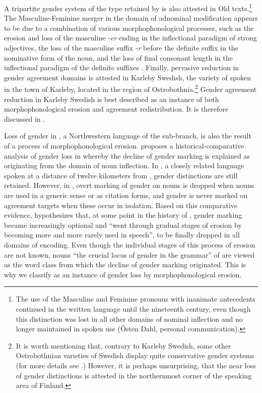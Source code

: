 \documentclass[output=collectionpaper]{langsci/langscibook}
\begin{document}
A tripartite gender system of the type retained by  is also attested in Old  texts.\footnote{The use of the Masculine and Feminine pronouns with inanimate antecedents continued in the written language until the nineteenth century, even though this distinction was lost in all other domains of nominal inflection and no longer maintained in spoken use (\"{O}sten Dahl, personal communication).} The Masculine-Feminine merger in the domain of adnominal modification appears to be due to a combination of various morphophonological processes, such as the erosion and loss of the masculine \textit{-er} ending in the inflectional paradigm of strong adjectives, the loss of the masculine suffix \textit{-r} before the definite suffix in the nominative form of the noun, and the loss of final consonant length in the inflectional paradigm of the definite suffixes \citep[652--654]{Duke2010}. Finally, pervasive reduction in gender agreement domains is attested in Karleby Swedish, the variety of  spoken in the town of Karleby, located in the  region of Ostrobothnia.\footnote{It is worth mentioning that, contrary to Karleby Swedish, some other Ostrobothnian varieties of Swedish display quite conservative gender systems (for more details see \citealt[40--50]{Hulden1972}.) However, it is perhaps unsurprising, that the near loss of gender distinctions is attested in the northernmost corner of the  speaking area of Finland.} 
\largerpage
Gender agreement reduction in Karleby Swedish is best described as an instance of both morphophonological erosion and agreement redistribution. It is therefore discussed in .

Loss of gender in , a Northwestern  language of the  sub-branch, is also the result of a process of morphophonological erosion. \citet{Stilotoappear} proposes a historical-comparative analysis of gender loss in  whereby the decline of gender marking is explained as originating from the domain of noun inflection. In , a closely related language spoken at a distance of twelve kilometers from , gender distinctions are still retained. However, in , overt marking of gender on nouns is dropped when nouns are used in a generic sense or as citation forms, and gender is never marked on agreement targets when these occur in isolation. Based on this comparative evidence, \citet[27]{Stilotoappear} hypothesizes that, at some point in the history of , gender marking became increasingly optional and ``went through gradual stages of erosion by becoming more and more rarely used in speech'', to be finally dropped in all domains of encoding. Even though the individual stages of this process of erosion are not known, nouns \textendash{} ``the crucial locus of gender in the grammar'' of  \citep[27]{Stilotoappear} \textendash{} are viewed as the word class from which the decline of gender marking originated. This is why we classify  as an instance of gender loss by morphophonological erosion.
\end{document}
